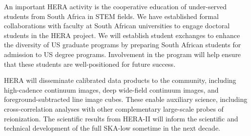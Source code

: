 \documentclass[preprint]{aastex}
\begin{document}
An important HERA activity is the cooperative education of
under-served students from South Africa in STEM fields.
We have established formal collaborations
with faculty at South African universities to engage doctoral students in the HERA project.
We will establish student exchanges to enhance
the diversity of US graduate programs by preparing South African students for
admission to US degree programs.
Involvement in the program will help ensure that these students are well-positioned for
future success.

HERA will disseminate calibrated data products to the community,
including high-cadence continuum images, deep wide-field continuum images, 
and foreground-subtracted line image cubes.  These enable
auxiliary science, including cross-correlation analyses with other 
complementary large-scale probes of reionization. The scientific results from HERA-II will inform the 
scientific and technical development of the full SKA-low sometime in the next decade.

\end{document}
